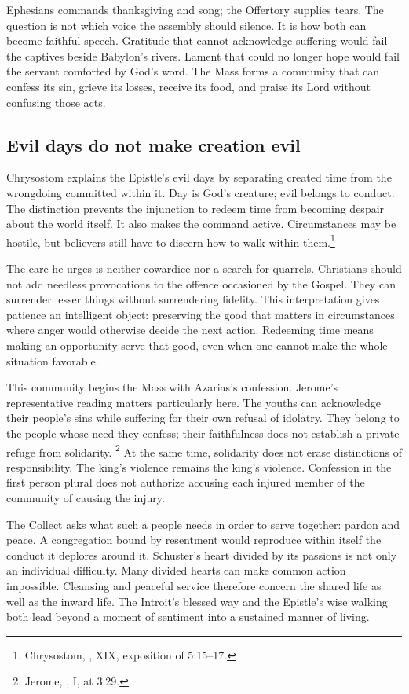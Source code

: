 
Ephesians commands thanksgiving and song; the Offertory supplies tears.
The question is not which voice the assembly should silence. It is how
both can become faithful speech. Gratitude that cannot acknowledge
suffering would fail the captives beside Babylon's rivers. Lament that
could no longer hope would fail the servant comforted by God's word.
The Mass forms a community that can confess its sin, grieve its losses,
receive its food, and praise its Lord without confusing those acts.

\subsection{Evil days do not make creation evil}
Chrysostom explains the Epistle's evil days by separating created time
from the wrongdoing committed within it. Day is God's creature; evil
belongs to conduct. The distinction prevents the injunction to redeem
time from becoming despair about the world itself. It also makes the
command active. Circumstances may be hostile, but believers still have
to discern how to walk within them.\footnote{Chrysostom, , XIX, exposition of 5:15--17.}

The care he urges is neither cowardice nor a search for quarrels.
Christians should not add needless provocations to the offence occasioned
by the Gospel. They can surrender lesser things without surrendering
fidelity. This interpretation gives patience an intelligent object:
preserving the good that matters in circumstances where anger would
otherwise decide the next action. Redeeming time means making an
opportunity serve that good, even when one cannot make the whole
situation favorable.

This community begins the Mass with Azarias's confession. Jerome's
representative reading matters particularly here. The youths can
acknowledge their people's sins while suffering for their own refusal
of idolatry. They belong to the people whose need they confess; their
faithfulness does not establish a private refuge from solidarity.
\footnote{Jerome, , I, at 3:29.}
At the same time, solidarity does not erase distinctions of responsibility.
The king's violence remains the king's violence. Confession in the first
person plural does not authorize accusing each injured member of the
community of causing the injury.

The Collect asks what such a people needs in order to serve together:
pardon and peace. A congregation bound by resentment would reproduce
within itself the conduct it deplores around it. Schuster's heart divided
by its passions is not only an individual difficulty. Many divided
hearts can make common action impossible. Cleansing and peaceful
service therefore concern the shared life as well as the inward life.
The Introit's blessed way and the Epistle's wise walking both lead
beyond a moment of sentiment into a sustained manner of living.

